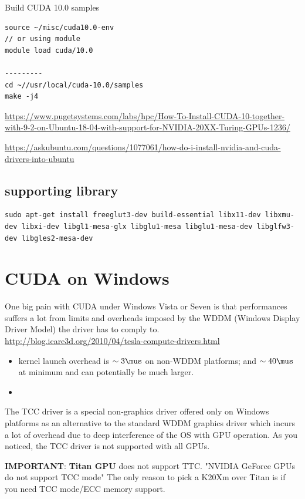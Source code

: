 Build CUDA 10.0 samples
\begin{verbatim}
source ~/misc/cuda10.0-env
// or using module
module load cuda/10.0

---------
cd ~//usr/local/cuda-10.0/samples
make -j4
\end{verbatim}

\url{https://www.pugetsystems.com/labs/hpc/How-To-Install-CUDA-10-together-with-9-2-on-Ubuntu-18-04-with-support-for-NVIDIA-20XX-Turing-GPUs-1236/}
 
\url{https://askubuntu.com/questions/1077061/how-do-i-install-nvidia-and-cuda-drivers-into-ubuntu}

\subsection{supporting library}

\begin{verbatim}
sudo apt-get install freeglut3-dev build-essential libx11-dev libxmu-dev libxi-dev libgl1-mesa-glx libglu1-mesa libglu1-mesa-dev libglfw3-dev libgles2-mesa-dev

\end{verbatim}


\section{CUDA on Windows}
\label{sec:cuda-windows}


One big pain with CUDA under Windows Vista or Seven is that performances suffers
a lot from limits and overheads imposed by the WDDM (Windows Display Driver
Model) the driver has to comply to.
\url{http://blog.icare3d.org/2010/04/tesla-compute-drivers.html}
\begin{itemize}
  \item kernel launch overhead is $\sim 3\mus$ on non-WDDM platforms; and $\sim 40 \mus$
  at minimum and can potentially be much larger.
  
  \item
\end{itemize}
The TCC driver is a special non-graphics driver offered only on Windows
platforms as an alternative to the standard WDDM graphics driver which incurs a
lot of overhead due to deep interference of the OS with GPU operation. As you
noticed, the TCC driver is not supported with all GPUs.

{\bf IMPORTANT}: {\bf Titan GPU} does not support TTC. "NVIDIA GeForce GPUs do not support TCC mode"
The only reason to pick a K20Xm over Titan is if you need TCC mode/ECC memory support.

